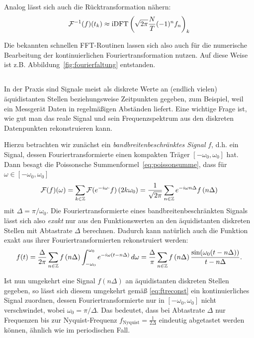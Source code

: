 Analog lässt sich auch die Rücktransformation nähern:
\begin{equation}
  \label{eq:idftcont}
  \mathcal F^{-1}(f)(t_k)\approx
  \text{iDFT}\left(\sqrt{2\pi}\frac{N}{T}(-1)^n f_n\right)_k
\end{equation}

Die bekannten schnellen FFT-Routinen lassen sich also auch für die
numerische Bearbeitung der kontinuierlichen Fouriertransformation
nutzen. Auf diese Weise ist z.B. Abbildung~\ref{fig:fourierfaltung}
entstanden.

\subsection{}

In der Praxis sind Signale meist als diskrete Werte an (endlich
vielen) äquidistanten Stellen beziehungsweise Zeitpunkten gegeben, zum
Beispiel, weil ein Messgerät Daten in regelmäßigen Abständen liefert.
Eine wichtige Frage ist, wie gut man das reale Signal und sein
Frequenzspektrum aus den diskreten Datenpunkten rekonstruieren kann.

Hierzu betrachten wir zunächst ein \emph{bandbreitenbeschränktes
  Signal} $f$, d.h. ein Signal, dessen Fouriertransformierte einen
kompakten Träger $[-\omega_0,\omega_0]$ hat. Dann besagt die
Poissonsche Summenformel~\eqref{eq:poissonsumme}, dass für
$\omega\in[-\omega_0,\omega_0]$
\begin{equation}
  \mathcal F(f)(\omega) =
  \sum_{k\in\mathbb{Z}}\mathcal F(e^{-i\omega \cdot} f)\left(2k\omega_0\right)
  =
  \frac{1}{\sqrt{2\pi}}
  \sum_{n\in\mathbb{Z}} e^{-i \omega n \Delta}f\left(n \Delta\right)
\end{equation}
mit $\Delta=\pi/\omega_0$. Die Fouriertransformierte eines
bandbreitenbeschränkten Signals lässt sich also \emph{exakt} nur aus
den Funktionswerten an den äquidistanten diskreten Stellen mit
Abtastrate $\Delta$ berechnen. Dadurch kann natürlich auch die
Funktion exakt aus ihrer Fouriertransformierten rekonstruiert werden:
\begin{equation}
  \label{eq:ftreconst}
  f(t)
  = \frac{\Delta}{2\pi}\sum_{n\in\mathbb{Z}} f\left(n \Delta\right)
  \int_{-\omega_0}^{\omega_0} e^{-i \omega (t - n\Delta)} \,d\omega
  = \frac{\Delta}{\pi}\sum_{n\in\mathbb{Z}} f\left(n \Delta\right)
  \frac{\sin(\omega_0(t-n\Delta))}{t-n\Delta}.
\end{equation}

Ist nun umgekehrt eine Signal $f(n\Delta)$ an äquidistanten diskreten
Stellen gegeben, so lässt sich diesem umgekehrt gemäß
\eqref{eq:ftreconst} ein kontinuierliches Signal zuordnen, dessen
Fouriertransformierte nur in $[-\omega_0,\omega_0]$ nicht
verschwindet, wobei $\omega_0 = \pi/\Delta$. Das bedeutet, dass bei
Abtastrate $\Delta$ nur Frequenzen bis zur Nyquist-Frequenz
$f_\text{Nyquist}=\frac{1}{2\Delta}$ eindeutig abgetastet werden
können, ähnlich wie im periodischen Fall.

